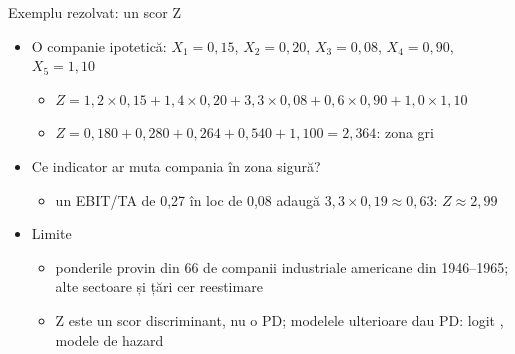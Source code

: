 \begin{frame}{Exemplu rezolvat: un scor Z}
\itemsize{\small}
\begin{itemize}
    \item O companie ipotetică: $X_1 = 0{,}15$, $X_2 = 0{,}20$, $X_3 = 0{,}08$, $X_4 = 0{,}90$, $X_5 = 1{,}10$
    \begin{itemize}
        \item $Z = 1{,}2 \times 0{,}15 + 1{,}4 \times 0{,}20 + 3{,}3 \times 0{,}08 + 0{,}6 \times 0{,}90 + 1{,}0 \times 1{,}10$
        \item $Z = 0{,}180 + 0{,}280 + 0{,}264 + 0{,}540 + 1{,}100 = 2{,}364$: zona gri
    \end{itemize}
    \item Ce indicator ar muta compania în zona sigură?
    \begin{itemize}
        \item un EBIT/TA de 0,27 în loc de 0,08 adaugă $3{,}3 \times 0{,}19 \approx 0{,}63$: $Z \approx 2{,}99$
    \end{itemize}
    \item Limite
    \begin{itemize}
        \item ponderile provin din 66 de companii industriale americane din 1946--1965; alte sectoare și țări cer reestimare
        \item Z este un scor discriminant, nu o PD; modelele ulterioare dau PD: logit , modele de hazard 
    \end{itemize}
\end{itemize}
\end{frame}

